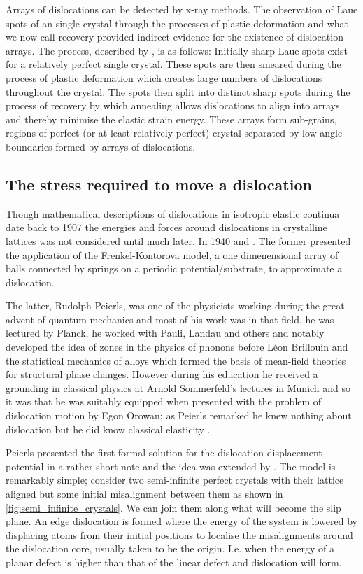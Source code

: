 Arrays of dislocations can be detected by x-ray methods. The observation of Laue spots of an single crystal through the processes of plastic deformation and what we now call recovery provided indirect evidence for the existence of dislocation arrays. The process, described by \citet{Cottrell1949}, is as follows: Initially sharp Laue spots exist for a relatively perfect single crystal. These spots are then smeared during the process of plastic deformation which creates large numbers of dislocations throughout the crystal. The spots then split into distinct sharp spots during the process of recovery by which annealing allows dislocations to align into arrays and thereby minimise the elastic strain energy. These arrays form sub-grains, regions of perfect (or at least relatively perfect) crystal separated by low angle boundaries formed by arrays of dislocations.


\subsection{The stress required to move a dislocation}

Though mathematical descriptions of dislocations in isotropic elastic continua date back to 1907 \cite{Volterra1907} the energies and forces around dislocations in crystalline lattices was not considered until much later. In 1940 \citet{Dehlinger1940} and \citet{Peierls1940}. The former presented the application of the Frenkel-Kontorova model, a one dimenensional array of balls connected by springs on a periodic potential/substrate, to approximate a dislocation.

The latter, Rudolph Peierls, was one of the physicists working during the great advent of quantum mechanics and most of his work was in that field, he was lectured by Planck, he worked with Pauli, Landau and others and
notably developed the idea of zones in the physics of phonons before Léon Brillouin and the statistical mechanics of alloys which formed the basis of mean-field theories for structural phase changes.
However during his education he received a grounding in classical physics at Arnold Sommerfeld's lectures in Munich and so it was that he was suitably equipped when presented with the problem of dislocation motion by Egon Orowan; as Peierls remarked he knew nothing about dislocation but he did know classical elasticity \cite{Edwards1996}.


Peierls presented the first formal solution for the dislocation displacement potential in a rather short note \cite{Peierls1940} and the idea was extended by \citet{Nabarro1947}. The model is remarkably simple; consider two semi-infinite perfect crystals with their lattice aligned but some initial misalignment between them as shown in \autoref{fig:semi_infinite_crystals}. We can join them along what will become the slip plane. An edge dislocation is formed where the energy of the system is lowered by displacing atoms from their initial positions to localise the misalignments around the dislocation core, usually taken to be the origin. I.e. when the energy of a planar defect is higher than that of the linear defect and dislocation will form.


